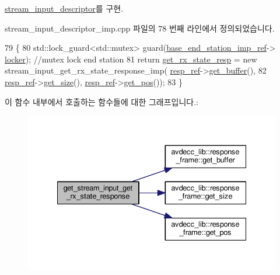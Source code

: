 \hyperlink{classavdecc__lib_1_1stream__input__descriptor_a16a103984d891491a224e518ace35b06}{stream\+\_\+input\+\_\+descriptor}를 구현.



stream\+\_\+input\+\_\+descriptor\+\_\+imp.\+cpp 파일의 78 번째 라인에서 정의되었습니다.


\begin{DoxyCode}
79 \{
80     std::lock\_guard<std::mutex> guard(\hyperlink{classavdecc__lib_1_1descriptor__base__imp_a550c969411f5f3b69f55cc139763d224}{base\_end\_station\_imp\_ref}->
      \hyperlink{classavdecc__lib_1_1end__station__imp_a2207f93fef130266b292686bf96ef8d3}{locker}); \textcolor{comment}{//mutex lock end station}
81     \textcolor{keywordflow}{return} \hyperlink{classavdecc__lib_1_1stream__input__descriptor__imp_a76b63ae360764e834e3a261b748c2591}{get\_rx\_state\_resp} = \textcolor{keyword}{new} stream\_input\_get\_rx\_state\_response\_imp(
      \hyperlink{classavdecc__lib_1_1descriptor__base__imp_a2642e3a7c10d38553e7ff4a55e875346}{resp\_ref}->\hyperlink{classavdecc__lib_1_1response__frame_ad4680d622c198b5256c03b2eb2638c22}{get\_buffer}(),
82                                                                           
      \hyperlink{classavdecc__lib_1_1descriptor__base__imp_a2642e3a7c10d38553e7ff4a55e875346}{resp\_ref}->\hyperlink{classavdecc__lib_1_1response__frame_adf55ed6a1edf8e1aa4f3f5f97936ad1e}{get\_size}(), \hyperlink{classavdecc__lib_1_1descriptor__base__imp_a2642e3a7c10d38553e7ff4a55e875346}{resp\_ref}->\hyperlink{classavdecc__lib_1_1response__frame_a4038092b7b420000faefc768241adb42}{get\_pos}());
83 \}
\end{DoxyCode}


이 함수 내부에서 호출하는 함수들에 대한 그래프입니다.\+:
\nopagebreak
\begin{figure}[H]
\begin{center}
\leavevmode
\includegraphics[width=335pt]{classavdecc__lib_1_1stream__input__descriptor__imp_add40c2ed45d64b8d7e50f668ca6fc65a_cgraph}
\end{center}
\end{figure}


